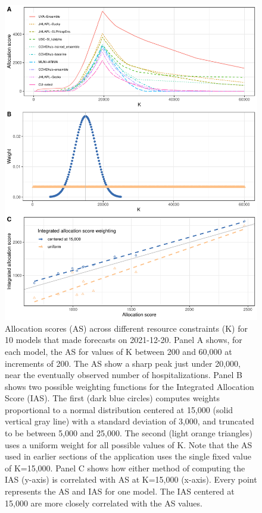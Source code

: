 \documentclass{article}\usepackage[]{graphicx}\usepackage[]{xcolor}
\makeatletter
\def\maxwidth{ %
  \ifdim\Gin@nat@width>\linewidth
    \linewidth
  \else
    \Gin@nat@width
  \fi
}
\newenvironment{knitrout}{}{} %
\makeatother
\begin{document}
\begin{knitrout}
\color{fgcolor}\begin{figure}
\includegraphics[width=\maxwidth]{figure/multi-k-1} \caption[Allocation scores (AS) across different resource constraints (K) for 10 models that made forecasts on 2021-12-20]{Allocation scores (AS) across different resource constraints (K) for 10 models that made forecasts on 2021-12-20. Panel A shows, for each model, the AS for values of K between 200 and 60,000 at increments of 200. The AS show a sharp peak just under 20,000, near the eventually observed number of hospitalizations. Panel B shows two possible weighting functions for the Integrated Allocation Score (IAS). The first (dark blue circles) computes weights proportional to a normal distribution centered at 15,000 (solid vertical gray line) with a standard deviation of 3,000, and truncated to be between 5,000 and 25,000. The second (light orange triangles) uses a uniform weight for all possible values of K. Note that the AS used in earlier sections of the application uses the single fixed value of K=15,000.  Panel C shows how either method of computing the IAS (y-axis) is correlated with AS at K=15,000 (x-axis). Every point represents the AS and IAS for one model. The IAS centered at 15,000 are more closely correlated with the AS values.}\label{fig:multi-k}
\end{figure}

\end{knitrout}
\end{document}
